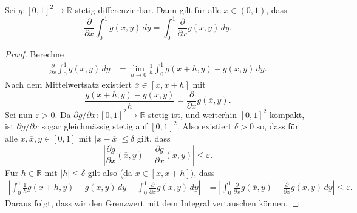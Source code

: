 \documentclass[../main.tex]{subfiles}
\begin{document}
\begin{lemma*}
  Sei $g \colon [0, 1]^2 \to \mathbb{R}$ stetig differenzierbar.
  Dann gilt für alle $x \in (0, 1)$, dass
  \[
    \frac{\partial}{\partial x} \int_{0}^{1} g(x, y) \, dy
    = \int_{0}^{1} \frac{\partial}{\partial x} g(x, y) \, dy.
  \]
\end{lemma*}

\begin{proof}
  Berechne
  \begin{align*}
    \frac{\partial}{\partial x}
    \int_{0}^{1} g(x, y) \, dy
    &= \lim_{h \to 0} \frac{1}{h}
    \int_{0}^{1} g(x + h, y) - g(x, y) \, dy.
  \end{align*}
  Nach dem Mittelwertsatz existiert
  $\overline x \in [x, x + h]$ mit
  \[
    \frac{g(x + h, y) - g(x, y)}{h}= \frac{\partial}{\partial x}
    g(\overline x, y).
  \]
  Sei nun $\varepsilon > 0$.
  Da $\partial g / \partial x \colon [0, 1]^2 \to \mathbb{R}$ 
  stetig ist, und weiterhin $[0, 1]^2$ kompakt,
  ist $\partial g/\partial x$ sogar gleichmässig stetig
  auf  $[0, 1]^2$.
  Also existiert $\delta > 0$ so, dass für alle
  $x, \overline x, y \in [0,1]$ mit $|x - \overline x| \leq \delta$ 
  gilt, dass
  \[
    \left| \frac{\partial g}{\partial x}(\overline x, y)
    - \frac{\partial g}{\partial x}(x, y) \right| \leq \varepsilon.
  \]
  Für $h \in \mathbb{R}$ mit $|h| \leq \delta$ 
  gilt also (da $\overline x \in [x, x + h])$, dass
  \begin{align*}
    \left| \int_{0}^{1} \frac{1}{h}
    g(x + h, y) - g(x, y)\, dy
    - \int_{0}^{1} \frac{\partial}{\partial x}g(x, y) \, dy \right|
    &= \left| 
    \int_{0}^{1} 
    \frac{\partial}{\partial x} g(\overline x, y)
    - \frac{\partial}{\partial x}g(x, y)\, dy \right| 
    \leq \varepsilon.
  \end{align*}
  Daraus folgt, dass wir den Grenzwert mit dem Integral
  vertauschen können.
\end{proof}
\end{document}
